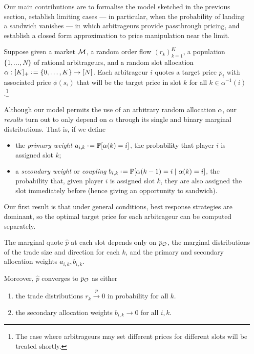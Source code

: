 Our main contributions are to formalise the model sketched in the previous section, establish limiting cases --- in particular, when the probability of landing a sandwich vanishes --- in which arbitrageurs provide passthrough pricing, and establish a closed form approximation to price manipulation near the limit.

Suppose given a market $\mathcal{M}$, a random order flow $(r_k)_{k=1}^K$, a population $\{1,\ldots,N\}$ of rational arbitrageurs, and a random slot allocation $\alpha:[K]_+\defeq\{0,\ldots,K\}\rightarrow[N]$.
%
Each arbitrageur $i$ quotes a target price $p_i$ with associated price $\phi(s_i)$ that will be the target price in slot $k$ for all $k\in\alpha^{-1}(i)$.\footnote{The case where arbitrageurs may set different prices for different slots will be treated shortly.}

Although our model permits the use of an arbitrary random allocation $\alpha$, our \emph{results} turn out to only depend on $\alpha$ through its single and binary marginal distributions.
%
That is, if we define
\begin{itemize}
  \item the \emph{primary weight} $a_{i,k} \defeq \Probability[\alpha(k)=i]$, the probability that player $i$ is assigned slot $k$;
  \item a \emph{secondary weight} or \emph{coupling} $b_{i,k} \defeq \Probability[\alpha(k-1)=i \mid \alpha(k)=i]$, the probability that, given player $i$ is assigned slot $k$, they are also assigned the slot immediately before (hence giving an opportunity to sandwich).
\end{itemize}

Our first result is that under general conditions, best response strategies are dominant, so the optimal target price for each arbitrageur can be computed separately.

\begin{theorem}

  The marginal quote $\hat{p}$ at each slot depends only on $p_{\mathcal{O}}$, the marginal distributions of the trade size and direction for each $k$, and the primary and secondary allocation weights $a_{i,k},b_{i,k}$.
  
  Moreover, $\hat{p}$ converges to $p_{\mathcal{O}}$ as either
  \begin{enumerate}
    \item the trade distributions $r_k\stackrel{p}{\rightarrow}0$ in probability for all $k$.
    \item the secondary allocation weights $b_{i,k}\rightarrow 0$ for all $i,k$.
  \end{enumerate}

\end{theorem}

